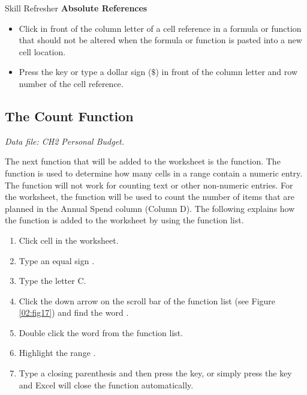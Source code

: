 \begin{center}
	\begin{sklbox}{Skill Refresher}
		\textbf{Absolute References}
		\\
		\begin{itemize}
			\setlength{\itemsep}{0pt}
			\setlength{\parskip}{0pt}
			\setlength{\parsep}{0pt}
			
			\item Click in front of the column letter of a cell reference in a formula or function that should not be altered when the formula or function is pasted into a new cell location.
			\item Press the  key or type a dollar sign ($ \$ $) in front of the column letter and row number of the cell reference.

		\end{itemize}
	\end{sklbox}
\end{center}

\subsection{The Count Function}

\textit{Data file: CH2 Personal Budget.}

The next function that will be added to the  worksheet is the  function. The  function is used to determine how many cells in a range contain a numeric entry. The  function will not work for counting text or other non-numeric entries. For the  worksheet, the  function will be used to count the number of items that are planned in the Annual Spend column (Column D). The following explains how the  function is added to the worksheet by using the function list.

\begin{enumerate}
	\item Click cell  in the  worksheet.
	\item Type an equal sign \fmtTyping{=}.
	\item Type the letter C.
	\item Click the down arrow on the scroll bar of the function list (see Figure \ref{02:fig17}) and find the word .
	\item Double click the word  from the function list.
	\item Highlight the range .
	\item Type a closing parenthesis \fmtTyping{)} and then press the  key, or simply press the  key and Excel will close the function automatically.
\end{enumerate}

